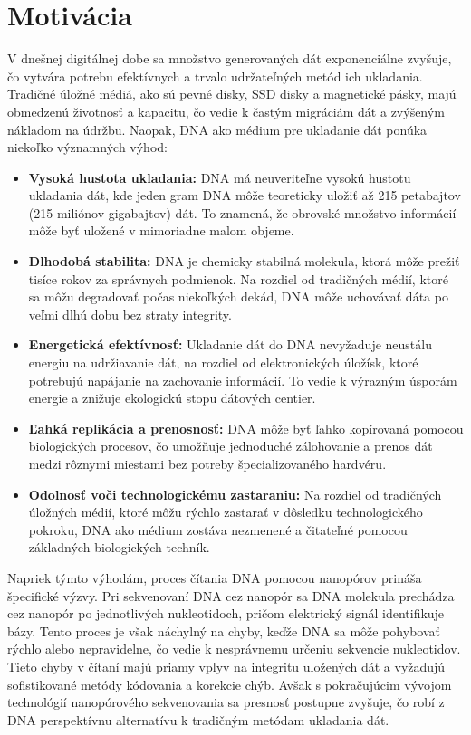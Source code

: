 \section{Motivácia}
V dnešnej digitálnej dobe sa množstvo generovaných dát exponenciálne zvyšuje,
čo vytvára potrebu efektívnych a trvalo udržateľných metód ich ukladania. 
Tradičné úložné médiá, ako sú pevné disky, SSD disky a magnetické pásky,
majú obmedzenú životnosť a kapacitu, čo vedie k častým migráciám dát
a zvýšeným nákladom na údržbu. Naopak, DNA ako médium pre ukladanie dát ponúka niekoľko významných výhod:
\begin{itemize} 
    \item \textbf{Vysoká hustota ukladania:} DNA má neuveriteľne vysokú hustotu ukladania dát, kde jeden gram DNA môže teoreticky uložiť až 215 petabajtov (215 miliónov gigabajtov) dát. To znamená, že obrovské množstvo informácií môže byť uložené v mimoriadne malom objeme.
    \item \textbf{Dlhodobá stabilita:} DNA je chemicky stabilná molekula, ktorá môže prežiť tisíce rokov za správnych podmienok. Na rozdiel od tradičných médií, ktoré sa môžu degradovať počas niekoľkých dekád, DNA môže uchovávať dáta po veľmi dlhú dobu bez straty integrity.
    \item \textbf{Energetická efektívnosť:} Ukladanie dát do DNA nevyžaduje neustálu energiu na udržiavanie dát, na rozdiel od elektronických úložísk, ktoré potrebujú napájanie na zachovanie informácií. To vedie k výrazným úsporám energie a znižuje ekologickú stopu dátových centier.
    \item \textbf{Ľahká replikácia a prenosnosť:} DNA môže byť ľahko kopírovaná pomocou biologických procesov, čo umožňuje jednoduché zálohovanie a prenos dát medzi rôznymi miestami bez potreby špecializovaného hardvéru.
    \item \textbf{Odolnosť voči technologickému zastaraniu:} Na rozdiel od tradičných úložných médií, ktoré môžu rýchlo zastarať v dôsledku technologického pokroku, DNA ako médium zostáva nezmenené a čitateľné pomocou základných biologických techník.
\end{itemize}


Napriek týmto výhodám, proces čítania DNA pomocou nanopórov prináša špecifické výzvy.
Pri sekvenovaní DNA cez nanopór sa DNA molekula prechádza cez nanopór po jednotlivých nukleotidoch,
pričom elektrický signál identifikuje bázy. Tento proces je však náchylný na chyby, 
keďže DNA sa môže pohybovať rýchlo alebo nepravidelne, čo vedie k nesprávnemu
určeniu sekvencie nukleotidov. Tieto chyby v čítaní majú priamy vplyv na integritu
uložených dát a vyžadujú sofistikované metódy kódovania a korekcie chýb.
Avšak s pokračujúcim vývojom technológií nanopórového sekvenovania sa
presnosť postupne zvyšuje, čo robí z DNA perspektívnu alternatívu k tradičným metódam ukladania dát.

